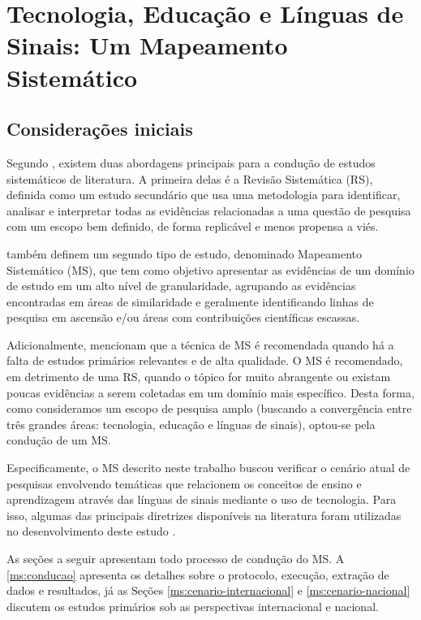 \chapter{Tecnologia, Educação e Línguas de Sinais: Um Mapeamento Sistemático}
\label{chapter:mapeamento-sistematico}

\section{Considerações iniciais}
\label{ms:inicio}

Segundo , existem duas abordagens principais para a condução de estudos sistemáticos de literatura. A primeira delas é a Revisão Sistemática (RS), definida como um estudo secundário que usa uma metodologia para identificar, analisar e interpretar todas as evidências relacionadas a uma questão de pesquisa com um escopo bem definido, de forma replicável e menos propensa a viés.

 também definem um segundo tipo de estudo, denominado Mapeamento Sistemático (MS), que tem como objetivo apresentar as evidências de um domínio de estudo em um alto nível de granularidade, agrupando as evidências encontradas em áreas de similaridade e geralmente identificando linhas de pesquisa em ascensão e/ou áreas com contribuições científicas escassas.

Adicionalmente,  mencionam que a técnica de MS é recomendada quando há a falta de estudos primários relevantes e de alta qualidade. O MS é recomendado, em detrimento de uma RS, quando o tópico for muito abrangente ou existam poucas evidências a serem coletadas em um domínio mais específico. Desta forma, como consideramos um escopo de pesquisa amplo (buscando a convergência entre três grandes áreas: tecnologia, educação e línguas de sinais), optou-se pela condução de um MS.

Especificamente, o MS descrito neste trabalho buscou verificar o cenário atual de pesquisas envolvendo temáticas que relacionem os conceitos de ensino e aprendizagem através das línguas de sinais mediante o uso de tecnologia. Para isso, algumas das principais diretrizes disponíveis na literatura foram utilizadas no desenvolvimento deste estudo \cite{Kitchenham2007,Zhang2011,Petersen2015}.

As seções a seguir apresentam todo processo de condução do MS. A \autoref{ms:conducao} apresenta os detalhes sobre o protocolo, execução, extração de dados e resultados, já as Seções \ref{ms:cenario-internacional} e \ref{ms:cenario-nacional} discutem os estudos primários sob as perspectivas internacional e nacional.

